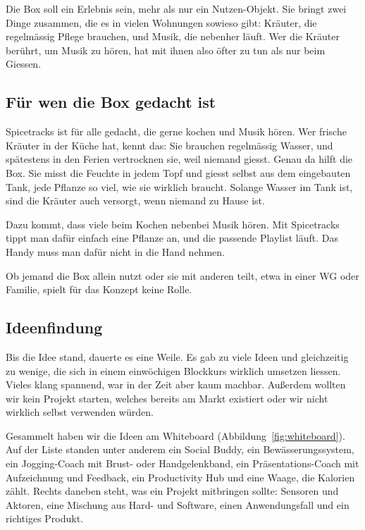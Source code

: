 \documentclass[11pt,a4paper]{article}
\begin{document}
Die Box soll ein Erlebnis sein, mehr als nur ein Nutzen-Objekt. Sie bringt zwei Dinge zusammen, die es in vielen Wohnungen sowieso gibt: Kräuter, die regelmässig Pflege brauchen, und Musik, die nebenher läuft. Wer die Kräuter berührt, um Musik zu hören, hat mit ihnen also öfter zu tun als nur beim Giessen.

\subsection{Für wen die Box gedacht ist}

Spicetracks ist für alle gedacht, die gerne kochen und Musik hören. Wer frische Kräuter in der Küche hat, kennt das: Sie brauchen regelmässig Wasser, und spätestens in den Ferien vertrocknen sie, weil niemand giesst. Genau da hilft die Box. Sie misst die Feuchte in jedem Topf und giesst selbst aus dem eingebauten Tank, jede Pflanze so viel, wie sie wirklich braucht. Solange Wasser im Tank ist, sind die Kräuter auch versorgt, wenn niemand zu Hause ist.

Dazu kommt, dass viele beim Kochen nebenbei Musik hören. Mit Spicetracks tippt man dafür einfach eine Pflanze an, und die passende Playlist läuft. Das Handy muss man dafür nicht in die Hand nehmen.

Ob jemand die Box allein nutzt oder sie mit anderen teilt, etwa in einer WG oder Familie, spielt für das Konzept keine Rolle.

\subsection{Ideenfindung}

Bis die Idee stand, dauerte es eine Weile. Es gab zu viele Ideen und gleichzeitig zu wenige, die sich in einem einwöchigen Blockkurs wirklich umsetzen liessen. Vieles klang spannend, war in der Zeit aber kaum machbar. Außerdem wollten wir kein Projekt starten, welches bereits am Markt existiert oder wir nicht wirklich selbst verwenden würden.

Gesammelt haben wir die Ideen am Whiteboard (Abbildung~\ref{fig:whiteboard}). Auf der Liste standen unter anderem ein Social Buddy, ein Bewässerungssystem, ein Jogging-Coach mit Brust- oder Handgelenkband, ein Präsentations-Coach mit Aufzeichnung und Feedback, ein Productivity Hub und eine Waage, die Kalorien zählt. Rechts daneben steht, was ein Projekt mitbringen sollte: Sensoren und Aktoren, eine Mischung aus Hard- und Software, einen Anwendungsfall und ein richtiges Produkt.
\end{document}
